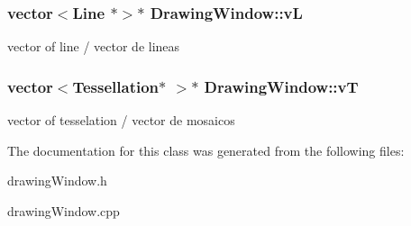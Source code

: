 \subsubsection[{v\+L}]{\setlength{\rightskip}{0pt plus 5cm}vector$<${\bf Line} $\ast$$>$$\ast$ Drawing\+Window\+::v\+L\hspace{0.3cm}{\ttfamily [private]}}\label{class_drawing_window_a6e1effc34bb2f2c43becfd1df203b693}
vector of line / vector de lineas \hypertarget{class_drawing_window_a00c917f0910ac7b70729d6a48f0602ac}{}
\subsubsection[{v\+T}]{\setlength{\rightskip}{0pt plus 5cm}vector$<${\bf Tessellation}$\ast$ $>$$\ast$ Drawing\+Window\+::v\+T\hspace{0.3cm}{\ttfamily [private]}}\label{class_drawing_window_a00c917f0910ac7b70729d6a48f0602ac}
vector of tesselation / vector de mosaicos 

The documentation for this class was generated from the following files\+:\begin{DoxyCompactItemize}
\item 
drawing\+Window.\+h\item 
drawing\+Window.\+cpp\end{DoxyCompactItemize}
